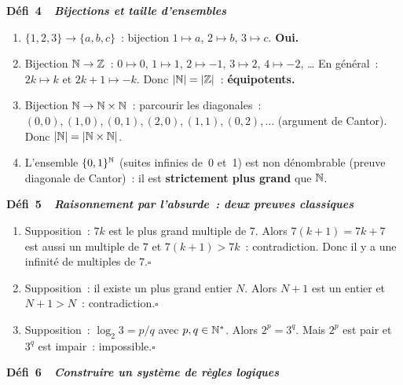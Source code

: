 \noindent{}
{\color{BO}\bfseries\small D\'efi~4~\textendash\ \textit{Bijections et taille d'ensembles}}
\par\smallskip

\begin{enumerate}
  \item $\{1,2,3\}\to\{a,b,c\}$~: bijection $1\mapsto a$, $2\mapsto b$, $3\mapsto c$. \textbf{Oui.}
  \item Bijection $\mathbb{N}\to\mathbb{Z}$~: $0\mapsto0$, $1\mapsto1$, $2\mapsto-1$, $3\mapsto2$, $4\mapsto-2$, \ldots
        En g\'en\'eral~: $2k\mapsto k$ et $2k+1\mapsto-k$.
        Donc $|\mathbb{N}|=|\mathbb{Z}|$~: \textbf{\'equipotents.}
  \item Bijection $\mathbb{N}\to\mathbb{N}\times\mathbb{N}$~: parcourir les diagonales~:
        $(0,0),(1,0),(0,1),(2,0),(1,1),(0,2),\ldots$ (argument de Cantor).
        Donc $|\mathbb{N}|=|\mathbb{N}\times\mathbb{N}|$.
  \item L'ensemble $\{0,1\}^{\mathbb{N}}$ (suites infinies de~0 et~1) est non d\'enombrable
        (preuve diagonale de Cantor)~: il est \textbf{strictement plus grand} que $\mathbb{N}$.
\end{enumerate}

\noindent{}
{\color{BO}\bfseries\small D\'efi~5~\textendash\ \textit{Raisonnement par l'absurde~: deux preuves classiques}}
\par\smallskip

\begin{enumerate}
  \item Supposition~: $7k$ est le plus grand multiple de $7$.
        Alors $7(k+1)=7k+7$ est aussi un multiple de $7$ et $7(k+1)>7k$~: contradiction.
        Donc il y a une infinit\'e de multiples de $7$.\hfill$\square$
  \item Supposition~: il existe un plus grand entier $N$.
        Alors $N+1$ est un entier et $N+1>N$~: contradiction.\hfill$\square$
  \item Supposition~: $\log_2 3=p/q$ avec $p,q\in\mathbb{N}^*$.
        Alors $2^p=3^q$. Mais $2^p$ est pair et $3^q$ est impair~: impossible.\hfill$\square$
\end{enumerate}

\noindent{}
{\color{BO}\bfseries\small D\'efi~6~\textendash\ \textit{Construire un syst\`eme de r\`egles logiques}}
\par\smallskip

